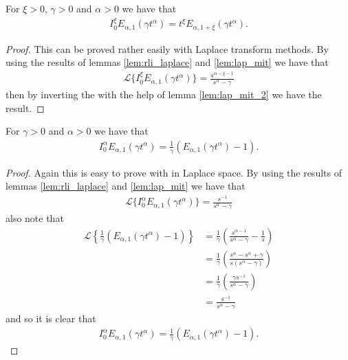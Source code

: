 \begin{mdframed}[innertopmargin=10pt]
\begin{lemma}
\label{lem-rli-mit-lef-1}
For $ \xi > 0 $, $ \gamma > 0 $ and $ \alpha > 0 $ we have that
	\begin{align}
		{I}^\xi_0 E_{\alpha,1}(\gamma t^\alpha) = t^\xi E_{\alpha,1+\xi}(\gamma t^\alpha).
	\end{align}
\end{lemma}
\end{mdframed}
\begin{proof}
	This can be proved rather easily with Laplace transform methods.
	By using the results of lemmas \ref{lem:rli_laplace} and \ref{lem:lap_mit} we have that
	\begin{align}
	    \mathcal{L}\{ I_0^\xi E_{\alpha, 1}(\gamma t^\alpha) \} = \frac{s^{\alpha-\xi-1}}{s^\alpha - \gamma}
	\end{align}
	then by inverting the with the help of lemma \ref{lem:lap_mit_2} we have the result.
\end{proof}

\begin{mdframed}[innertopmargin=10pt]
\begin{lemma}	
\label{lem-rli-mit-lef-2}
For $ \gamma > 0 $ and $ \alpha > 0 $ we have that
	\begin{align}
		I_0^\alpha E_{\alpha,1}(\gamma t^\alpha) = \frac{1}{\gamma} \left( E_{\alpha,1}(\gamma t^\alpha) - 1 \right).
	\end{align}
\end{lemma}
\end{mdframed}
\begin{proof}
	Again this is easy to prove with in Laplace space.
	By using the results of lemmas \ref{lem:rli_laplace} and \ref{lem:lap_mit} we have that
	\begin{align}
    	\mathcal{L}\{ I_0^\alpha E_{\alpha, 1}(\gamma t^\alpha) \} = \frac{s^{-1}}{s^\alpha - \gamma}
	\end{align}
	also note that
	\begin{align}
	    \mathcal{L}\left\{ \frac{1}{\gamma}( E_{\alpha, 1}(\gamma t^\alpha) - 1) \right\} &= \frac{1}{\gamma} \left( \frac{s^{\alpha-1}}{s^\alpha - \gamma} - \frac{1}{s} \right) \\
	    &= \frac{1}{\gamma}\left( \frac{s^\alpha - s^\alpha + \gamma}{s(s^\alpha - \gamma)}\right) \\
	    &= \frac{1}{\gamma}\left(\frac{\gamma s^{-1}}{s^\alpha - \gamma}\right) \\
	    &= \frac{s^{-1}}{s^\alpha - \gamma}
	\end{align}
	and so it is clear that
	\begin{align}
I_0^\alpha E_{\alpha,1}(\gamma t^\alpha) = \frac{1}{\gamma} \left( E_{\alpha,1}(\gamma t^\alpha) - 1 \right).
	\end{align}
\end{proof}


